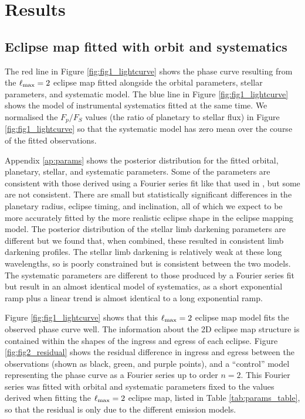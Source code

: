 \documentclass[twocolumn]{aastex631}
\begin{document}
\section{Results} \label{sec:results}

\subsection{Eclipse map fitted with orbit and systematics}\label{sec:results:map}

The red line in Figure \ref{fig:fig1_lightcurve} shows the phase curve resulting from the $\ell_{\rm max}=2$ eclipse map fitted alongside the orbital parameters, stellar parameters, and systematic model. The blue line in Figure \ref{fig:fig1_lightcurve} shows the model of instrumental systematics fitted at the same time. We normalised the $F_{p}/F_{S}$ values (the ratio of planetary to stellar flux) in Figure \ref{fig:fig1_lightcurve} so that the systematic model has zero mean over the course of the fitted observations. 

Appendix \ref{ap:params} shows the posterior distribution for the fitted orbital, planetary, stellar, and systematic parameters. Some of the parameters are consistent with those derived using a Fourier series fit like that used in \citet{bell2023wasp43b}, but some are not consistent. There are small but statistically significant differences in the planetary radius, eclipse timing, and inclination, all of which we expect to be more accurately fitted by the more realistic eclipse shape in the eclipse mapping model. The posterior distribution of the stellar limb darkening parameters are different but we found that, when combined, these resulted in consistent limb darkening profiles. The stellar limb darkening is relatively weak at these long wavelengths, so is poorly constrained but is consistent between the two models. The systematic parameters are different to those produced by a Fourier series fit \citep{bell2023wasp43b} but result in an almost identical model of systematics, as a short exponential ramp plus a linear trend is almost identical to a long exponential ramp.

Figure \ref{fig:fig1_lightcurve} shows that this $\ell_{\rm max}=2$ eclipse map model fits the observed phase curve well. The information about the 2D eclipse map structure is contained within the shapes of the ingress and egress of each eclipse. Figure \ref{fig:fig2_residual} shows the residual difference in ingress and egress between the observations (shown as black, green, and purple points), and a ``control'' model representing the phase curve as a Fourier series up to order $n=2$. This Fourier series was fitted with orbital and systematic parameters fixed to the values derived when fitting the $\ell_{\rm max}=2$ eclipse map, listed in Table \ref{tab:params_table}, so that the residual is only due to the different emission models. 
\end{document}
